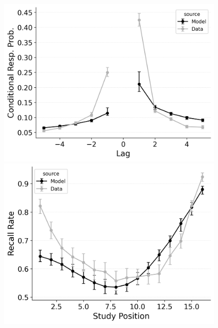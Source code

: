 \documentclass[
  man,
  floatsintext,
  longtable,
  nolmodern,
  notxfonts,
  notimes,
  draftfirst,
  colorlinks=true,linkcolor=blue,citecolor=blue,urlcolor=blue]{apa7}
\begin{document}
\begin{figure}
\begin{minipage}{0.33\linewidth}
\includegraphics{figures/bw_HealeyKahana2014_CRU_with_Free_Start_Drift_rate_Fitting_crp.png}\end{minipage}%
%
\begin{minipage}{0.33\linewidth}
\includegraphics{figures/bw_HealeyKahana2014_CRU_with_Free_Start_Drift_rate_Fitting_spc.png}\end{minipage}%
\newline
\begin{minipage}{0.33\linewidth}

\end{minipage}
\end{figure}
\end{document}
